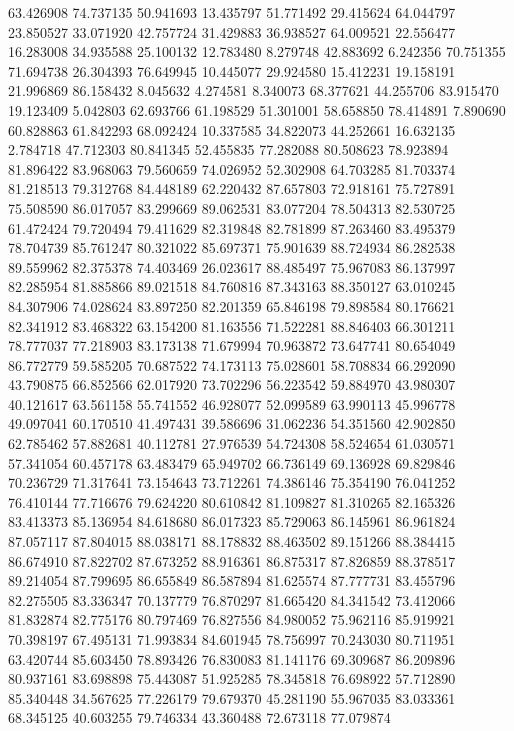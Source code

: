 63.426908
74.737135
50.941693
13.435797
51.771492
29.415624
64.044797
23.850527
33.071920
42.757724
31.429883
36.938527
64.009521
22.556477
16.283008
34.935588
25.100132
12.783480
8.279748
42.883692
6.242356
70.751355
71.694738
26.304393
76.649945
10.445077
29.924580
15.412231
19.158191
21.996869
86.158432
8.045632
4.274581
8.340073
68.377621
44.255706
83.915470
19.123409
5.042803
62.693766
61.198529
51.301001
58.658850
78.414891
7.890690
60.828863
61.842293
68.092424
10.337585
34.822073
44.252661
16.632135
2.784718
47.712303
80.841345
52.455835
77.282088
80.508623
78.923894
81.896422
83.968063
79.560659
74.026952
52.302908
64.703285
81.703374
81.218513
79.312768
84.448189
62.220432
87.657803
72.918161
75.727891
75.508590
86.017057
83.299669
89.062531
83.077204
78.504313
82.530725
61.472424
79.720494
79.411629
82.319848
82.781899
87.263460
83.495379
78.704739
85.761247
80.321022
85.697371
75.901639
88.724934
86.282538
89.559962
82.375378
74.403469
26.023617
88.485497
75.967083
86.137997
82.285954
81.885866
89.021518
84.760816
87.343163
88.350127
63.010245
84.307906
74.028624
83.897250
82.201359
65.846198
79.898584
80.176621
82.341912
83.468322
63.154200
81.163556
71.522281
88.846403
66.301211
78.777037
77.218903
83.173138
71.679994
70.963872
73.647741
80.654049
86.772779
59.585205
70.687522
74.173113
75.028601
58.708834
66.292090
43.790875
66.852566
62.017920
73.702296
56.223542
59.884970
43.980307
40.121617
63.561158
55.741552
46.928077
52.099589
63.990113
45.996778
49.097041
60.170510
41.497431
39.586696
31.062236
54.351560
42.902850
62.785462
57.882681
40.112781
27.976539
54.724308
58.524654
61.030571
57.341054
60.457178
63.483479
65.949702
66.736149
69.136928
69.829846
70.236729
71.317641
73.154643
73.712261
74.386146
75.354190
76.041252
76.410144
77.716676
79.624220
80.610842
81.109827
81.310265
82.165326
83.413373
85.136954
84.618680
86.017323
85.729063
86.145961
86.961824
87.057117
87.804015
88.038171
88.178832
88.463502
89.151266
88.384415
86.674910
87.822702
87.673252
88.916361
86.875317
87.826859
88.378517
89.214054
87.799695
86.655849
86.587894
81.625574
87.777731
83.455796
82.275505
83.336347
70.137779
76.870297
81.665420
84.341542
73.412066
81.832874
82.775176
80.797469
76.827556
84.980052
75.962116
85.919921
70.398197
67.495131
71.993834
84.601945
78.756997
70.243030
80.711951
63.420744
85.603450
78.893426
76.830083
81.141176
69.309687
86.209896
80.937161
83.698898
75.443087
51.925285
78.345818
76.698922
57.712890
85.340448
34.567625
77.226179
79.679370
45.281190
55.967035
83.033361
68.345125
40.603255
79.746334
43.360488
72.673118
77.079874
